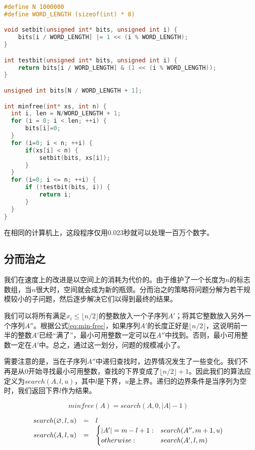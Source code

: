 \documentclass[b5paper]{ctexart}
\begin{document}
\begin{lstlisting}[language=C]
#define N 1000000
#define WORD_LENGTH (sizeof(int) * 8)

void setbit(unsigned int* bits, unsigned int i) {
    bits[i / WORD_LENGTH] |= 1 << (i % WORD_LENGTH);
}

int testbit(unsigned int* bits, unsigned int i) {
    return bits[i / WORD_LENGTH] & (1 << (i % WORD_LENGTH));
}

unsigned int bits[N / WORD_LENGTH + 1];

int minfree(int* xs, int n) {
  int i, len = N/WORD_LENGTH + 1;
  for (i = 0; i < len; ++i) {
      bits[i]=0;
  }
  for (i=0; i < n; ++i) {
      if(xs[i] < n) {
          setbit(bits, xs[i]);
      }
  }
  for (i=0; i <= n; ++i) {
      if (!testbit(bits, i)) {
          return i;
      }
  }
}
\end{lstlisting}

在相同的计算机上，这段程序仅用0.023秒就可以处理一百万个数字。

\subsection*{分而治之}
我们在速度上的改进是以空间上的消耗为代价的。由于维护了一个长度为$n$的标志数组，当$n$很大时，空间就会成为新的瓶颈。分而治之的策略将问题分解为若干规模较小的子问题，然后逐步解决它们以得到最终的结果。

我们可以将所有满足$x_i \leq \lfloor n/2 \rfloor$的整数放入一个子序列$A'$；将其它整数放入另外一个序列$A''$。根据公式\ref{eq:min-free}，如果序列$A'$的长度正好是$\lfloor n/2 \rfloor$，这说明前一半的整数$A'$已经“满了”，最小可用整数一定可以在$A''$中找到。否则，最小可用整数一定在$A'$中。总之，通过这一划分，问题的规模减小了。

需要注意的是，当在子序列$A''$中递归查找时，边界情况发生了一些变化。我们不再是从0开始寻找最小可用整数，查找的下界变成了$\lfloor n/2 \rfloor + 1$。因此我们的算法应定义为$search(A, l, u)$，其中$l$是下界，$u$是上界。递归的边界条件是当序列为空时，我们返回下界$l$作为结果。

\[
minfree(A) = search(A, 0, |A|-1)
\]

\[
\begin{array}{rcl}
search(\varnothing, l, u) & = & l \\
search(A, l, u) & = & \begin{cases}
       |A'| = m - l + 1 : & search(A'', m+1, u) \\
       otherwise : & search(A',  l, m) \\
\end{cases}
\end{array}
\]
\end{document}
